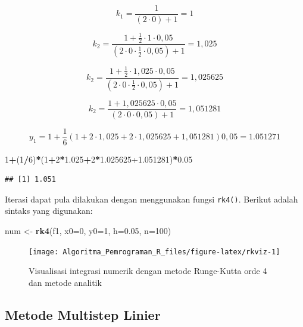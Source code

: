 \documentclass[
]{book}
\newenvironment{Shaded}{\begin{snugshade}}{\end{snugshade}}
\newcommand{\AttributeTok}[1]{\textcolor[rgb]{0.13,0.29,0.53}{#1}}
\newcommand{\DecValTok}[1]{\textcolor[rgb]{0.00,0.00,0.81}{#1}}
\newcommand{\FloatTok}[1]{\textcolor[rgb]{0.00,0.00,0.81}{#1}}
\newcommand{\FunctionTok}[1]{\textcolor[rgb]{0.13,0.29,0.53}{\textbf{#1}}}
\newcommand{\NormalTok}[1]{#1}
\newcommand{\OtherTok}[1]{\textcolor[rgb]{0.56,0.35,0.01}{#1}}
\newcommand{\SpecialCharTok}[1]{\textcolor[rgb]{0.81,0.36,0.00}{\textbf{#1}}}
\theoremstyle{definition}
\theoremstyle{definition}
\theoremstyle{definition}
\theoremstyle{definition}
\theoremstyle{remark}
\begin{document}
\[
k_1=\frac{1}{\left(2\cdot 0\right)+1}=1
\]

\[
k_2=\frac{1+\frac{1}{2}\cdot1\cdot0,05}{\left(2\cdot 0\cdot\frac{1}{2}\cdot0,05\right)+1}=1,025
\]

\[
k_2=\frac{1+\frac{1}{2}\cdot1,025\cdot0,05}{\left(2\cdot 0\cdot\frac{1}{2}\cdot0,05\right)+1}=1,025625
\]

\[
k_2=\frac{1+1,025625\cdot0,05}{\left(2\cdot 0\cdot0,05\right)+1}=1,051281
\]

\[
y_1=1+\frac{1}{6}\left(1+2\cdot1,025+2\cdot1,025625+1,051281\right)0,05=1.051271
\]

\begin{Shaded}
\begin{Highlighting}[]
\DecValTok{1}\SpecialCharTok{+}\NormalTok{(}\DecValTok{1}\SpecialCharTok{/}\DecValTok{6}\NormalTok{)}\SpecialCharTok{*}\NormalTok{(}\DecValTok{1}\SpecialCharTok{+}\DecValTok{2}\SpecialCharTok{*}\FloatTok{1.025}\SpecialCharTok{+}\DecValTok{2}\SpecialCharTok{*}\FloatTok{1.025625+1.051281}\NormalTok{)}\SpecialCharTok{*}\FloatTok{0.05}
\end{Highlighting}
\end{Shaded}

\begin{verbatim}
## [1] 1.051
\end{verbatim}

Iterasi dapat pula dilakukan dengan menggunakan fungsi \texttt{rk4()}. Berikut adalah sintaks yang digunakan:

\begin{Shaded}
\begin{Highlighting}[]
\NormalTok{num }\OtherTok{\textless{}{-}} \FunctionTok{rk4}\NormalTok{(f1, }\AttributeTok{x0=}\DecValTok{0}\NormalTok{, }\AttributeTok{y0=}\DecValTok{1}\NormalTok{, }\AttributeTok{h=}\FloatTok{0.05}\NormalTok{, }\AttributeTok{n=}\DecValTok{100}\NormalTok{)}
\end{Highlighting}
\end{Shaded}

\begin{figure}

{\centering \texttt{[image: Algoritma\_Pemrograman\_R\_files/figure-latex/rkviz-1]} 

}

\caption{Visualisasi integrasi numerik dengan metode Runge-Kutta orde 4 dan metode analitik}\label{fig:rkviz}
\end{figure}

\hypertarget{mml}{%
\subsection{Metode Multistep Linier}\label{mml}}
\end{document}

